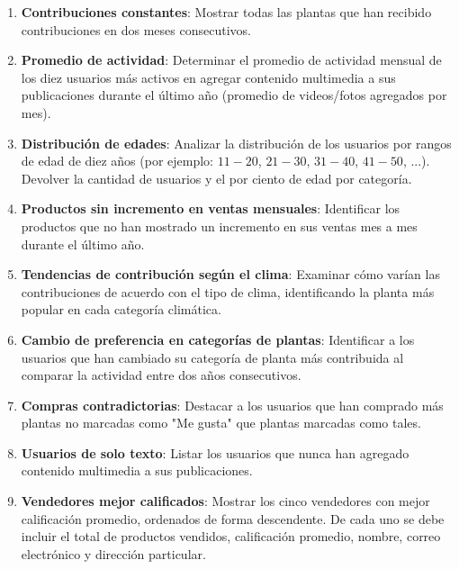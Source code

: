 \documentclass[10pt]{article}
\begin{document}
\begin{enumerate}
\begin{enumerate}
			\item \textbf{Contribuciones constantes}: Mostrar todas las plantas que han recibido contribuciones en dos meses consecutivos.

			\item \textbf{Promedio de actividad}: Determinar el promedio de actividad mensual de los diez usuarios más activos en agregar contenido multimedia a sus publicaciones durante el último año (promedio de videos/fotos agregados por mes).

			\item \textbf{Distribución de edades}: Analizar la distribución de los usuarios por rangos de edad de diez años (por ejemplo: $11-20$, $21-30$, $31-40$, $41-50$, ...). Devolver la cantidad de usuarios y el por ciento de edad por categoría.

			\item \textbf{Productos sin incremento en ventas mensuales}: Identificar los productos que no han mostrado un incremento en sus ventas mes a mes durante el último año.

			\item \textbf{Tendencias de contribución según el clima}: Examinar cómo varían las contribuciones de acuerdo con el tipo de clima, identificando la planta más popular en cada categoría climática.

			\item \textbf{Cambio de preferencia en categorías de plantas}: Identificar a los usuarios que han cambiado su categoría de planta más contribuida al comparar la actividad entre dos años consecutivos.

			\item \textbf{Compras contradictorias}: Destacar a los usuarios que han comprado más plantas no marcadas como "Me gusta" que plantas marcadas como tales.

			\item \textbf{Usuarios de solo texto}: Listar los usuarios que nunca han agregado contenido multimedia a sus publicaciones.

			\item \textbf{Vendedores mejor calificados}: Mostrar los cinco vendedores con mejor calificación promedio, ordenados de forma descendente. De cada uno se debe incluir el total de productos vendidos, calificación promedio, nombre, correo electrónico y dirección particular.


\end{enumerate}
\end{enumerate}
\end{document}
